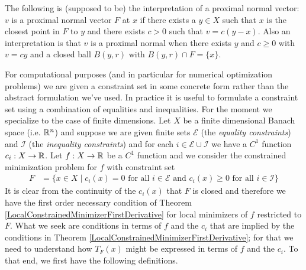 The following is (supposed to be) the interpretation of a proximal
normal vector: $v$ is a proximal normal vector $F$ at $x$ if there
exists a $y \in X$ such that $x$ is the closest point in $F$ to $y$
and there exists $c > 0$ such that $v = c(y -x)$.  Also an interpretation is that
$v$ is a proximal normal when there exists $y$ and $c \geq 0$ with $v = cy$ and
a closed ball $B(y,r)$ with $B(y,r) \cap F = \lbrace x \rbrace$.

For computational purposes (and in particular for numerical
optimization problems) we are given a constraint set in some concrete
form rather than the abstract formulation we've used.  In practice it
is useful to formulate a constraint set using a combination of
equalities and inequalities.  For the moment we specialize to the case
of finite dimensions.  Let $X$ be a finite dimensional Banach space
(i.e. $\mathbb{R}^n$) and suppose we are given finite sets $\mathcal{E}$
(the \emph{equality constraints})
and $\mathcal{I}$ (the \emph{inequality constraints}) and for each $i
\in \mathcal{E} \cup \mathcal{I}$ we have a $C^1$ 
function $c_i : X \to \mathbb{R}$.  Let $f : X \to \mathbb{R}$ be a $C^1$
function and we consider the constrained minimization problem for $f$
with constraint set 
\begin{align*}
F &= \lbrace x \in X \mid c_i(x) = 0 \text{ for all $i \in
    \mathcal{E}$ and } c_i(x) \geq 0 \text{ for all $i \in
    \mathcal{I}$} \rbrace
\end{align*}
It is clear from the continuity of the $c_i(x)$ that $F$ is closed and
therefore we have the first order necessary condition of Theorem
\ref{LocalConstrainedMinimizerFirstDerivative} for local minimizers of
$f$ restricted to $F$.  What we seek are
conditions in terms of $f$ and the $c_i$ that are implied by the
conditions in Theorem \ref{LocalConstrainedMinimizerFirstDerivative};
for that we need to understand how $T_F(x)$ might be expressed in
terms of $f$ and the $c_i$.  To that end, we first have the following
definitions.
